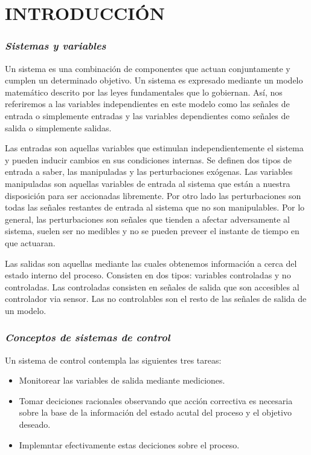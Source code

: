 \section*{\large{INTRODUCCIÓN}}
\vspace{-0.25cm}
\justifying

\subsubsection*{\it{Sistemas y variables}}
\vspace{-0.25cm}
Un sistema es una combinación de componentes que actuan conjuntamente y cumplen un determinado objetivo.
Un sistema es expresado mediante un modelo matemático descrito por las leyes fundamentales que lo gobiernan. 
Así, nos referiremos a las variables independientes en este modelo como las señales de entrada o simplemente entradas 
y las variables dependientes como señales de salida o simplemente salidas.

Las entradas son aquellas variables que estimulan independientemente el sistema y pueden inducir cambios en sus condiciones internas. Se definen dos 
tipos de entrada a saber, las manipuladas y las perturbaciones exógenas. Las variables manipuladas son aquellas variables de entrada al sistema que están
a nuestra disposición para ser accionadas libremente. Por otro lado las perturbaciones son todas las señales restantes de entrada al sistema que no son 
manipulables. Por lo general, las perturbaciones son señales que tienden a afectar adversamente al sistema, suelen ser no medibles y no se pueden preveer 
el instante de tiempo en que actuaran.

Las salidas son aquellas mediante las cuales obtenemos información a cerca del estado interno del proceso. Consisten en dos tipos: variables controladas 
y no controladas. Las controladas consisten en señales de salida que son accesibles al controlador via sensor. Las no controlables son el resto de las señales 
de salida de un modelo. \parencite{ADAM}

\subsubsection*{\it{Conceptos de sistemas de control}}
\vspace{-0.25cm}

Un sistema de control contempla las siguientes tres tareas:
\begin{itemize}[noitemsep]
    \item Monitorear las variables de salida mediante mediciones.
    \item Tomar deciciones racionales observando que acción correctiva es necesaria sobre la base de la información del estado acutal del proceso y el objetivo deseado.
    \item Implemntar efectivamente estas deciciones sobre el proceso.
\end{itemize}

